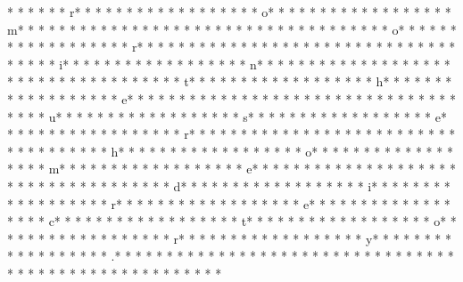 *  *  * * *  * r* * *  * * *  * * *  *  * * *  *  * * *  * o* * *  * * *  * * *  *  * * *  *  * * *  * m* * *  * * *  * * *  *  * * *  *  * * *  *  * * *  * * *  * * *  *  * * *  *  * * *  * o* * *  * * *  * * *  *  * * *  *  * * *  * r* * *  * * *  * * *  *  * * *  *  * * *  *  * * *  * * *  * * *  *  * * *  *  * * *  * i* * *  * * *  * * *  *  * * *  *  * * *  * n* * *  * * *  * * *  *  * * *  *  * * *  *  * * *  * * *  * * *  *  * * *  *  * * *  * t* * *  * * *  * * *  *  * * *  *  * * *  * h* * *  * * *  * * *  *  * * *  *  * * *  * e* * *  * * *  * * *  *  * * *  *  * * *  *  * * *  * * *  * * *  *  * * *  *  * * *  * u* * *  * * *  * * *  *  * * *  *  * * *  * s* * *  * * *  * * *  *  * * *  *  * * *  * e* * *  * * *  * * *  *  * * *  *  * * *  * r* * *  * * *  * * *  *  * * *  *  * * *  *  * * *  * * *  * * *  *  * * *  *  * * *  * h* * *  * * *  * * *  *  * * *  *  * * *  * o* * *  * * *  * * *  *  * * *  *  * * *  * m* * *  * * *  * * *  *  * * *  *  * * *  * e* * *  * * *  * * *  *  * * *  *  * * *  *  * * *  * * *  * * *  *  * * *  *  * * *  * d* * *  * * *  * * *  *  * * *  *  * * *  * i* * *  * * *  * * *  *  * * *  *  * * *  * r* * *  * * *  * * *  *  * * *  *  * * *  * e* * *  * * *  * * *  *  * * *  *  * * *  * c* * *  * * *  * * *  *  * * *  *  * * *  * t* * *  * * *  * * *  *  * * *  *  * * *  * o* * *  * * *  * * *  *  * * *  *  * * *  * r* * *  * * *  * * *  *  * * *  *  * * *  * y* * *  * * *  * * *  *  * * *  *  * * *  * .* * *  * * *  * * *  *  * * *  *  * * *  *  * * *  * * *  * * *  *  * * *  *  * * *  * 
* * *  * * *  * * *  *  * * *  *  * * *  * 
